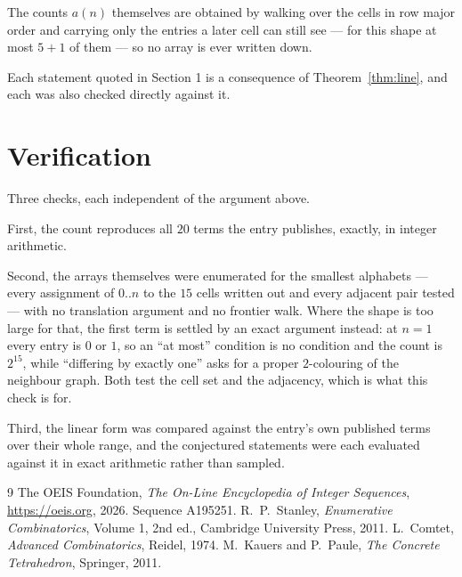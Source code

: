 \documentclass[11pt,a4paper]{article}
\theoremstyle{plain}
\theoremstyle{definition}
\begin{document}
The counts $a(n)$ themselves are obtained by walking over the cells in row major order and
carrying only the entries a later cell can still see --- for this shape at most $5+1$ of
them --- so no array is ever written down.

Each statement quoted in Section 1 is a consequence of Theorem~\ref{thm:line}, and each was
also checked directly against it.

\section{Verification}

Three checks, each independent of the argument above.

First, the count reproduces all $20$ terms the entry publishes, exactly, in integer
arithmetic.

Second, the arrays themselves were enumerated for the smallest alphabets --- every assignment
of $0..n$ to the $15$ cells written out and every adjacent pair tested --- with no
translation argument and no frontier walk. Where the shape is too large for that, the first
term is settled by an exact argument instead: at $n=1$ every entry is $0$ or $1$, so an ``at
most'' condition is no condition and the count is $2^{15}$, while ``differing by exactly
one'' asks for a proper $2$-colouring of the neighbour graph. Both test the cell set and the
adjacency, which is what this check is for.

Third, the linear form was compared against the entry's own published terms over their whole
range, and the conjectured statements were each evaluated against it in exact arithmetic
rather than sampled.

\begin{thebibliography}{9}
 The OEIS Foundation, \emph{The On-Line Encyclopedia of Integer
Sequences}, \url{https://oeis.org}, 2026. Sequence A195251.
 R.~P.~Stanley, \emph{Enumerative Combinatorics}, Volume 1, 2nd ed.,
Cambridge University Press, 2011.
 L.~Comtet, \emph{Advanced Combinatorics}, Reidel, 1974.
 M.~Kauers and P.~Paule, \emph{The Concrete Tetrahedron}, Springer, 2011.
\end{thebibliography}
\end{document}
